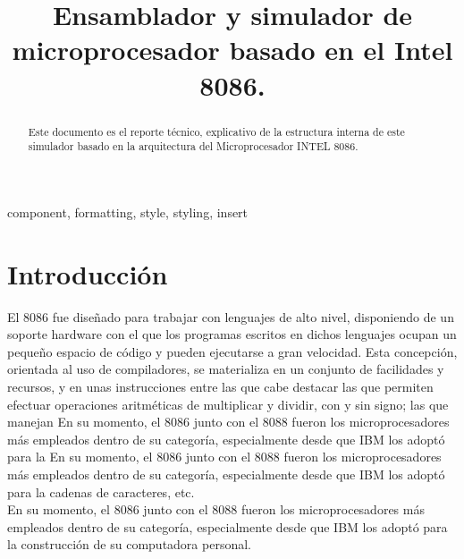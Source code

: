 \documentclass[conference]{IEEEtran}
\begin{document}
\renewcommand\IEEEkeywordsname{Palabras clave}

{\footnotesize 
\title{Ensamblador y simulador de microprocesador basado en el Intel 8086.}
}

\author{
\and
{}
\and
{}
}

\maketitle

\begin{abstract}
Este documento es el reporte técnico, explicativo de la estructura interna de este simulador basado en la arquitectura del Microprocesador INTEL 8086.
\end{abstract}

\begin{IEEEkeywords}
component, formatting, style, styling, insert
\end{IEEEkeywords}

\section{Introducción}
El 8086 fue diseñado para trabajar con lenguajes de alto nivel, disponiendo de un
soporte hardware con el que los programas escritos en dichos lenguajes ocupan un
pequeño espacio de código y pueden ejecutarse a gran velocidad. Esta concepción,
orientada al uso de compiladores, se materializa en un conjunto de facilidades y
recursos, y en unas instrucciones entre las que cabe destacar las que permiten efectuar
operaciones aritméticas de multiplicar y dividir, con y sin signo; las que manejan
En su momento, el 8086 junto con el 8088 fueron los microprocesadores más
empleados dentro de su categoría, especialmente desde que IBM los adoptó para la
En su momento, el 8086 junto con el 8088 fueron los microprocesadores más
empleados dentro de su categoría, especialmente desde que IBM los adoptó para la
cadenas de caracteres, etc.\\
En su momento, el 8086 junto con el 8088 fueron los microprocesadores más
empleados dentro de su categoría, especialmente desde que IBM los adoptó para la
construcción de su computadora personal.
\end{document}
